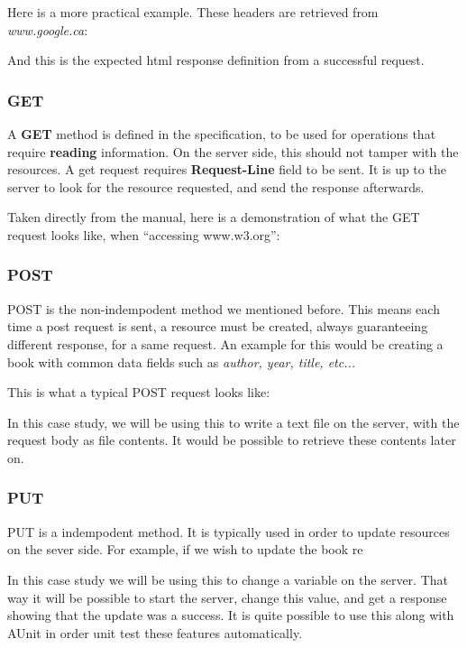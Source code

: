 Here is a more practical example. These headers are retrieved from \textit{www.google.ca}:


And this is the expected html response definition from a successful request.


\subsubsection{GET} 
A \textbf{GET} method is defined in the specification, to be used for
operations that require \textbf{reading} information. On the server side, this
should not tamper with the resources. 
A get request requires \textbf{Request-Line} field to be sent. It is up to the
server to look for the resource requested, and send the response afterwards.

Taken directly from the manual, here is a demonstration of what the GET request
looks like, when ``accessing www.w3.org'':


\subsubsection{POST} \label{http:axios-post}
POST is the non-indempodent method we mentioned before. This means each time a
post request is sent, a resource must be created, always guaranteeing different
response, for a same request. An example for this would be creating a book with
common data fields such as \textit{author, year, title, etc...}

This is what a typical POST request looks like:

In this case study, we will be using this to write a text file on the server,
with the request body as file contents. It would be possible to retrieve these
contents later on. 

\subsubsection{PUT}
PUT is a indempodent method. It is typically used in order to update resources
on the sever side. For example, if we wish to update the book re

In this case study we will be using this to change a variable on the server.
That way it will be possible to start the server, change this value, and get a
response showing that the update was a success. It is quite possible to use
this along with AUnit in order unit test these features automatically. 

